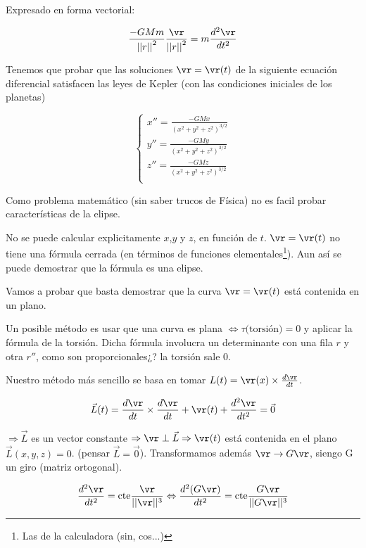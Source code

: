 Expresado en forma vectorial:

$$ \frac{-GMm}{{||r||}^2} \frac{\vr}{{||r||}^2}  =  m \frac{d^2\vr}{d t^2}$$


Tenemos que probar que las soluciones $\vr = \vr(t)$
 de la siguiente ecuación diferencial satisfacen las leyes de Kepler (con las condiciones iniciales de los planetas)


$$
\begin{cases}
 x'' = \frac{-GMx}{(x^2 + y^2 + z^2)^{3/2}}\\
 y'' = \frac{-GMy}{(x^2 + y^2 + z^2)^{3/2}}\\
 z'' = \frac{-GMz}{(x^2 + y^2 + z^2)^{3/2}}\\
\end{cases}
$$


 Como problema matemático (sin saber trucos de Física) no es facil probar características de la elipse. 

 \begin{obs}
 No se puede calcular explicitamente $x$,$y$ y $z$, en función de $t$. $\vr = \vr(t)$ no tiene una fórmula cerrada (en términos de funciones elementales\footnote{Las de la calculadora (sin, cos...)}). Aun así se puede demostrar que la fórmula es una elipse.
 \end{obs}


Vamos a probar que basta demostrar que la curva $\vr = \vr(t)$ está contenida en un plano. 

Un posible método es usar que una curva es plana $\Leftrightarrow \tau \text{(torsión)} = 0$ y aplicar la fórmula de la torsión. Dicha fórmula involucra un determinante con una fila $r$ y otra $r''$, como son proporcionales¿? la torsión sale 0.


Nuestro método más sencillo se basa en tomar $L(t) = \vr(x) \times \frac{d\vr}{dt}$.

$$\vec{L}(t) = \frac{d\vr}{dt} \times \frac{d\vr}{dt} + \vr(t) + \frac{d^2\vr}{dt^2} = \vec{0}$$ 

$\Rightarrow \vec{L}$ es un vector constante $\Rightarrow \vr \perp \vec{L} \Rightarrow \vr(t)$ está contenida en el plano $\vec{L}(x,y,z) = 0 $.
(pensar $\vec{L} = \vec{0}$). Transformamos además $\vr \rightarrow G\vr$, siengo G un giro (matriz ortogonal).

$$\frac{d^2\vr}{dt^2} = \text{cte}\frac{\vr}{||\vr||^3} \Leftrightarrow \frac{d^2(G\vr)}{dt^2} = \text{cte}\frac{G\vr}{||G\vr||^3}$$


